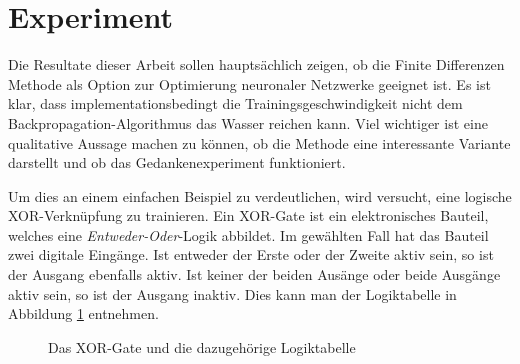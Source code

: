 \section{Experiment
	\label{ableitung:section:resultate}}
Die Resultate dieser Arbeit sollen hauptsächlich zeigen, ob die
Finite Differenzen Methode als Option zur Optimierung neuronaler
Netzwerke geeignet ist.
Es ist klar, dass implementationsbedingt die Trainingsgeschwindigkeit nicht dem Backpropagation-Algorithmus das Wasser reichen kann.
Viel wichtiger ist eine qualitative Aussage machen zu können, ob die Methode eine interessante Variante darstellt und ob das Gedankenexperiment funktioniert.

Um dies an einem einfachen Beispiel zu verdeutlichen, wird versucht,
eine logische XOR-Verknüpfung zu trainieren.
Ein XOR-Gate ist ein elektronisches Bauteil, welches eine
{\em Entweder-Oder}-Logik abbildet.
%
Im gewählten Fall hat das Bauteil zwei digitale Eingänge.
Ist entweder der Erste oder der Zweite aktiv sein, so ist der Ausgang
ebenfalls aktiv.
Ist keiner der beiden Ausänge oder beide Ausgänge aktiv sein,
so ist der Ausgang inaktiv.
Dies kann man der Logiktabelle in Abbildung \ref{ableitung:fig:xor-gate-logic} entnehmen.
%
\begin{figure}[h]
	 \centering
	\caption{Das XOR-Gate und die dazugehörige Logiktabelle}
	\label{ableitung:fig:xor-gate-logic}
\end{figure}
